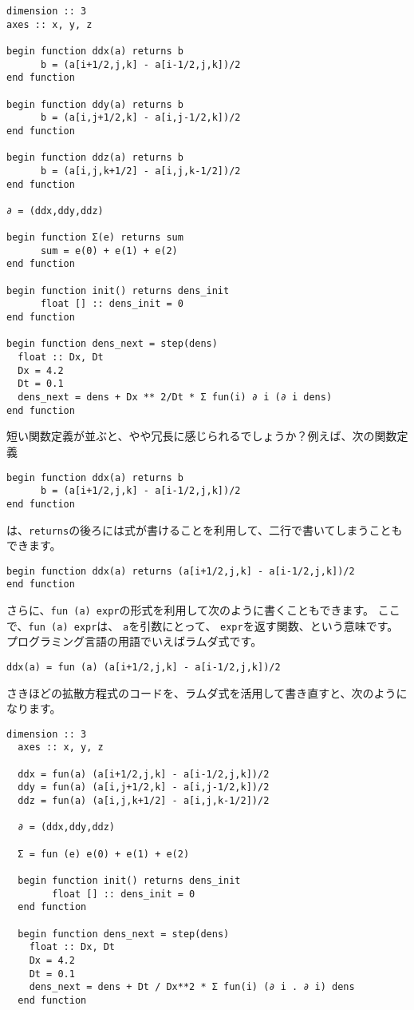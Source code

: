 \documentclass{jsarticle}
\begin{document}
\begin{lstlisting}[mathescape]
dimension :: 3
axes :: x, y, z

begin function ddx(a) returns b
      b = (a[i+1/2,j,k] - a[i-1/2,j,k])/2
end function

begin function ddy(a) returns b
      b = (a[i,j+1/2,k] - a[i,j-1/2,k])/2
end function

begin function ddz(a) returns b
      b = (a[i,j,k+1/2] - a[i,j,k-1/2])/2
end function

∂ = (ddx,ddy,ddz)

begin function Σ(e) returns sum
      sum = e(0) + e(1) + e(2)
end function

begin function init() returns dens_init
      float [] :: dens_init = 0
end function

begin function dens_next = step(dens)
  float :: Dx, Dt
  Dx = 4.2
  Dt = 0.1
  dens_next = dens + Dx ** 2/Dt * Σ fun(i) ∂ i (∂ i dens)
end function
\end{lstlisting}

短い関数定義が並ぶと、やや冗長に感じられるでしょうか？例えば、次の関数定義

\begin{lstlisting}[mathescape]
begin function ddx(a) returns b
      b = (a[i+1/2,j,k] - a[i-1/2,j,k])/2
end function
\end{lstlisting}

は、\verb`returns`の後ろには式が書けることを利用して、二行で書いてしまうこともできます。

\begin{lstlisting}[mathescape]
begin function ddx(a) returns (a[i+1/2,j,k] - a[i-1/2,j,k])/2
end function
\end{lstlisting}

さらに、\verb`fun (a) expr`の形式を利用して次のように書くこともできます。
ここで、\verb`fun (a) expr`は、
\verb`a`を引数にとって、
\verb`expr`を返す関数、という意味です。プログラミング言語の用語でいえばラムダ式です。

\begin{lstlisting}[mathescape]
ddx(a) = fun (a) (a[i+1/2,j,k] - a[i-1/2,j,k])/2
\end{lstlisting}



さきほどの拡散方程式のコードを、ラムダ式を活用して書き直すと、次のようになります。

\begin{lstlisting}[mathescape]
  dimension :: 3
  axes :: x, y, z

  ddx = fun(a) (a[i+1/2,j,k] - a[i-1/2,j,k])/2
  ddy = fun(a) (a[i,j+1/2,k] - a[i,j-1/2,k])/2
  ddz = fun(a) (a[i,j,k+1/2] - a[i,j,k-1/2])/2

  ∂ = (ddx,ddy,ddz)

  Σ = fun (e) e(0) + e(1) + e(2)

  begin function init() returns dens_init
        float [] :: dens_init = 0
  end function

  begin function dens_next = step(dens)
    float :: Dx, Dt
    Dx = 4.2
    Dt = 0.1
    dens_next = dens + Dt / Dx**2 * Σ fun(i) (∂ i . ∂ i) dens
  end function
\end{lstlisting}
\end{document}
